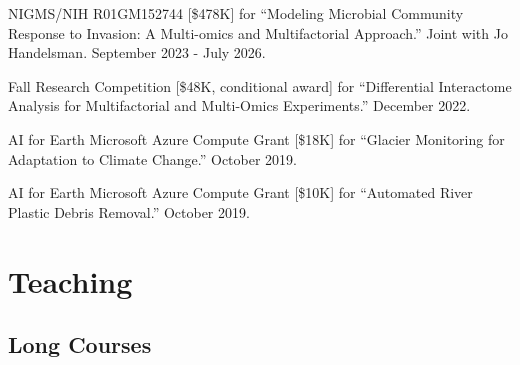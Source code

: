 \documentclass[letterpaper]{article}
\renewenvironment{itemize}{
  \begin{list}{}{
    \setlength{\leftmargin}{1.5em}
  }
}{
  \end{list}
}
\begin{document}
\begin{itemize}
\item NIGMS/NIH R01GM152744 [\$478K] for ``Modeling Microbial Community Response to Invasion: A Multi-omics and
Multifactorial Approach.'' Joint with Jo Handelsman. September 2023 - July 2026.
\item Fall Research Competition [\$48K, conditional award]
for ``Differential Interactome Analysis for Multifactorial and Multi-Omics
Experiments.'' December 2022.
\item AI for Earth Microsoft Azure Compute Grant [\$18K] for
``Glacier Monitoring for Adaptation to Climate Change.'' October 2019.
\item AI for Earth Microsoft Azure Compute Grant [\$10K] for
``Automated River Plastic Debris Removal.'' October 2019.
\end{itemize}

\section*{Teaching}

\subsection*{Long Courses}
\end{document}
